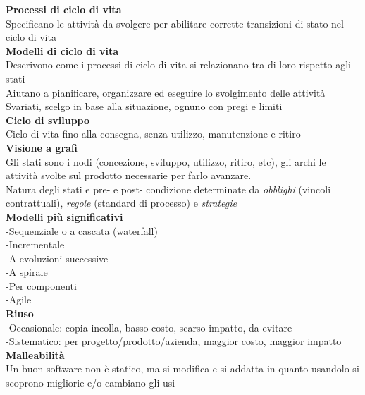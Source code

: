 \documentclass{article}
\begin{document}
		\textbf{Processi di ciclo di vita}\\
		Specificano le attività da svolgere per abilitare corrette transizioni di stato nel ciclo di vita\\
		
		
		\textbf{Modelli di ciclo di vita}\\
		Descrivono come i processi di ciclo di vita si relazionano tra di loro rispetto agli stati\\
		Aiutano a pianificare, organizzare ed eseguire lo svolgimento delle attività\\
		Svariati, scelgo in base alla situazione, ognuno con pregi e limiti\\
		
		\textbf{Ciclo di sviluppo}\\
		Ciclo di vita fino alla consegna, senza utilizzo, manutenzione e ritiro\\
		
		\textbf{Visione a grafi}\\
		Gli stati sono i nodi (concezione, sviluppo, utilizzo, ritiro, etc), gli archi le attività svolte sul prodotto necessarie per farlo avanzare.\\
		Natura degli stati e pre- e post- condizione determinate da \textit{obblighi} (vincoli contrattuali), \textit{regole} (standard di processo) e \textit{strategie}\\
		
		\textbf{Modelli più significativi}\\
		-Sequenziale o a cascata (waterfall)\\
		-Incrementale\\
		-A evoluzioni successive\\
		-A spirale\\
		-Per componenti\\
		-Agile\\
		
		\textbf{Riuso}\\
		-Occasionale: copia-incolla, basso costo, scarso impatto, da evitare\\
		-Sistematico: per progetto/prodotto/azienda, maggior costo, maggior impatto\\
		
		\textbf{Malleabilità}\\
		Un buon software non è statico, ma si modifica e si addatta in quanto usandolo si scoprono migliorie e/o cambiano gli usi\\
			
\end{document}
